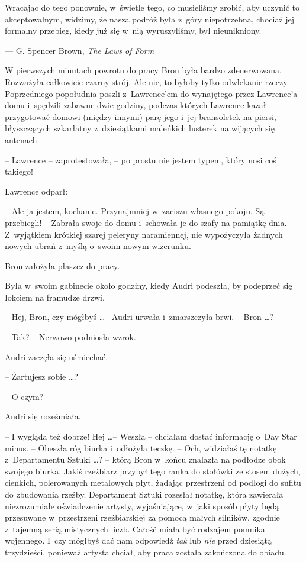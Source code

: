 \documentclass[oneside,polish,11pt,rmheadings]{mwbk}
\begin{document}
Wracając do tego ponownie, w~świetle tego, co musieliśmy zrobić, aby uczynić to akceptowalnym, widzimy, że nasza podróż była z~góry niepotrzebna, chociaż jej formalny przebieg, kiedy już się w~nią wyruszyliśmy, był nieunikniony. 

\smallskip
\noindent --- G. Spencer Brown, \textit{The Laws of Form }
\bigskip

W pierwszych minutach powrotu do pracy Bron była bardzo zdenerwowana. Rozważyła całkowicie czarny strój. Ale nie, to byłoby tylko odwlekanie rzeczy. Poprzedniego popołudnia poszli z~Lawrence'em do wynajętego przez Lawrence'a domu i~spędzili zabawne dwie godziny, podczas których Lawrence kazał przygotować domowi (między innymi) parę jego i~jej bransoletek na piersi, błyszczących szkarłatny z~dziesiątkami maleńkich lusterek na wijących się antenach. 

-- Lawrence -- zaprotestowała, -- po prostu nie jestem typem, który nosi coś takiego! 

Lawrence odparł: 

-- Ale ja jestem, kochanie. Przynajmniej w~zaciszu własnego pokoju. Są przebiegli! -- Zabrała swoje do domu i~schowała je do szafy na pamiątkę dnia. Z~wyjątkiem krótkiej szarej peleryny naramiennej, nie wypożyczyła żadnych nowych ubrań z~myślą o~swoim nowym wizerunku. 

Bron założyła płaszcz do pracy. 

Była w~swoim gabinecie około godziny, kiedy Audri podeszła, by podeprzeć się łokciem na framudze drzwi. 

-- Hej, Bron, czy mógłbyś \ldots  -- Audri urwała i~zmarszczyła brwi. -- Bron \ldots ? 

-- Tak? --  Nerwowo podniosła wzrok. 

Audri zaczęła się uśmiechać. 

-- Żartujesz sobie \ldots  ? 

-- O czym? 

Audri się roześmiała.

-- I wygląda też dobrze! Hej \ldots  -- Weszła -- chciałam dostać informację o~Day Star minus. -- Obeszła róg biurka i~odłożyła teczkę. -- Och, widziałaś tę notatkę z~Departamentu Sztuki \ldots ? -- którą Bron w~końcu znalazła na podłodze obok swojego biurka. Jakiś rzeźbiarz przybył tego ranka do stołówki ze stosem dużych, cienkich, polerowanych metalowych płyt, żądając przestrzeni od podłogi do sufitu do zbudowania rzeźby. Departament Sztuki rozesłał notatkę, która zawierała niezrozumiałe oświadczenie artysty, wyjaśniające, w~jaki sposób płyty będą przesuwane w~przestrzeni rzeźbiarskiej za pomocą małych silników, zgodnie z~tajemną serią mistycznych liczb. Całość miała być rodzajem pomnika wojennego. I~czy mógłbyś dać nam odpowiedź \textit{tak }lub \textit{nie }przed dziesiątą trzydzieści, ponieważ artysta chciał, aby praca została zakończona do obiadu. 
\end{document}
